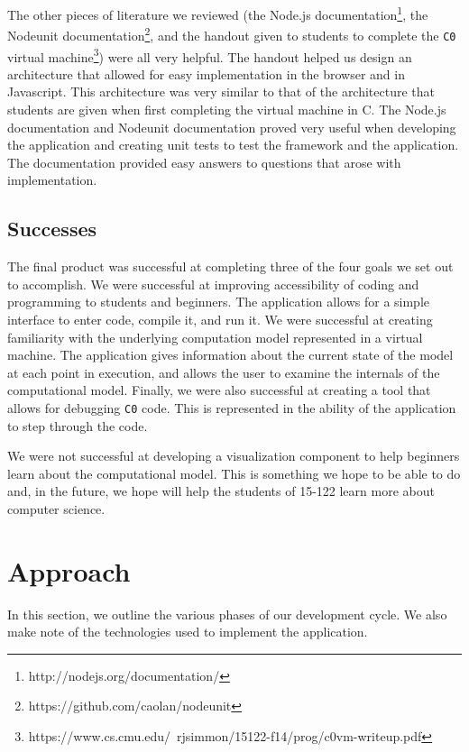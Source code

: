 \documentclass[11pt]{article}
\begin{document}
The other pieces of literature we reviewed (the Node.js
documentation\footnote{http://nodejs.org/documentation/}, the Nodeunit
documentation\footnote{https://github.com/caolan/nodeunit}, and the handout
given to students to complete the {\tt C0} virtual
machine\footnote{https://www.cs.cmu.edu/~rjsimmon/15122-f14/prog/c0vm-writeup.pdf})
were all very helpful. The handout helped us design an architecture that
allowed for easy implementation in the browser and in Javascript. This
architecture was very similar to that of the architecture that students are
given when first completing the virtual machine in C. The Node.js documentation
and Nodeunit documentation proved very useful when developing the application
and creating unit tests to test the framework and the application. The
documentation provided easy answers to questions that arose with implementation.
\subsection{Successes}
The final product was successful at completing three of the four goals we set
out to accomplish. We were successful at improving accessibility of coding and
programming to students and beginners. The application allows for a simple
interface to enter code, compile it, and run it. We were successful at
creating familiarity with the underlying computation model represented in a
virtual machine. The application gives information about the current state
of the model at each point in execution, and allows the user to examine the
internals of the computational model. Finally, we were also successful at
creating a tool that allows for debugging {\tt C0} code. This is represented
in the ability of the application to step through the code.
\par
We were not successful at developing a visualization component to help
beginners learn about the computational model. This is something we hope to
be able to do and, in the future, we hope will help the students of 15-122
learn more about computer science.

\section{Approach}
In this section, we outline the various phases of our development cycle. We
also make note of the technologies used to implement the application.
\end{document}
